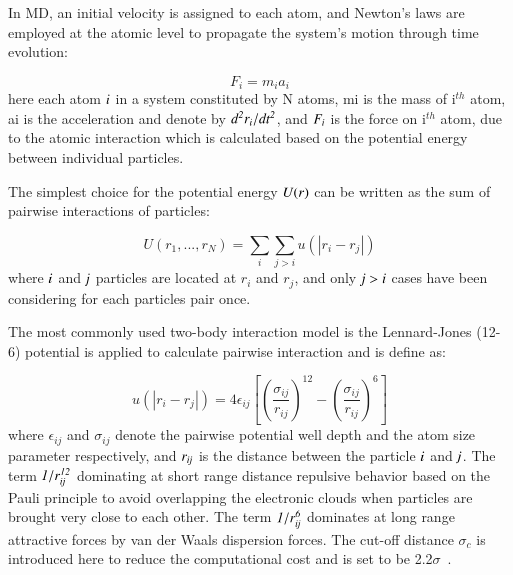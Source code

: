 \documentclass[preprint,12pt]{elsarticle}
\begin{document}
In MD, an initial velocity is assigned to each atom, and Newton's laws are employed at the atomic level to propagate the system's motion through time evolution:

\vspace{-.2em}
\begin{equation}
F_{i} = m_{i}a_{i}
\label{eq:Newton}
\end{equation}
\normalsize
here each atom $\it i $ in a system constituted by N atoms, mi is the mass of i$^{th}$ atom, ai is the acceleration and denote by $\it {d^2r_{i}} / {dt^2}$, and $\it F_{i}$ is the force on i$^{th}$ atom, due to the atomic interaction which is calculated based on the potential energy between individual particles.

The simplest choice for the potential energy $\it U(r)$  can be written as the sum of pairwise interactions of particles:

\vspace{-.2em}
\begin{equation}
U(r_{1}, ...  ,r_{N}) =  \displaystyle\sum_{i} \displaystyle\sum_{j>i}  u(|r_{i} - r_{j}|)
\label{eq:PEnergy}
\end{equation}
\normalsize
where $\it i$ and $\it j$ particles are located at $r_{i}$ and $r_{j}$, and only $\it j>i$ cases have been considering for each particles pair once.

The most commonly used two-body interaction model is the Lennard-Jones (12-6) potential is applied to calculate pairwise interaction and is define as:

\vspace{-.2em}
\begin{equation}
 u(|r_{i} - r_{j}|) = 4\epsilon_{ij}[(\frac{\sigma_{ij}}{r_{ij}})^{12}-(\frac{\sigma_{ij}}{r_{ij}})^{6}]
 \label{eq:LJ12}
\end{equation}
\normalsize
where $\epsilon_{ij}$ and $\sigma_{ij}$ denote the pairwise potential well depth and the atom size parameter respectively, and $\it r_{ij}$ is the distance between the particle $\it i$ and $\it j$. The term $\it 1/r_{ij}^{12}$ dominating at short range distance repulsive behavior based on the Pauli principle to avoid overlapping the electronic clouds when particles are  brought very close to each other. The term $\it 1/r_{ij}^6$ dominates at long range attractive forces by van der Waals dispersion forces. The cut-off distance $\sigma_{c}$ is introduced here to reduce the computational cost and is set to be 2.2$\sigma$~\cite{Travis}.
\end{document}
